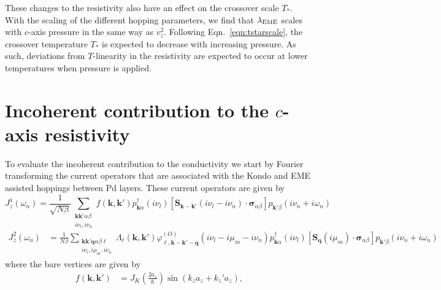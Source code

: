 \documentclass[aps,prl,twocolumn,superscriptaddress,amsmath,nofootinbib,10pt,floatfix]{revtex4-2}
\begin{document}
\begin{widetext}
 
These changes to the resistivity also have an effect on the crossover scale $T_*$. With the scaling of the different hopping parameters, we find that $\lambda_{\rm EME}$ scales with $c$-axis pressure in the same way as $v_z^2$. Following Eqn.~\ref{eqn:tstarscale},  the crossover temperature $T_*$ is expected to decrease with increasing pressure. As such, deviations from $T$-linearity in the resistivity are expected to occur at lower temperatures when pressure is applied.   


\section{Incoherent contribution to the $c$-axis resistivity} \label{appendix_caxis_inc}


To evaluate the incoherent contribution to the conductivity we start
by Fourier transforming the current operators that are associated
with the Kondo and EME assisted hoppings between Pd layers.
These current operators are given by 
\begin{equation}
J^{1}_{z}\left(\omega_{n}\right)=\frac{1}{\sqrt{N\beta}}\sum_{\begin{array}{c}
\boldsymbol{k}\boldsymbol{k}'\alpha\beta\\
i\nu_{l},i\nu_{n}
\end{array}}f\left(\boldsymbol{k},\boldsymbol{k}'\right)p_{\boldsymbol{k}\alpha}^{\dagger}\left(i\nu_{l}\right)\left[\bm{S}_{\boldsymbol{k}-\boldsymbol{k}'}\left(i\nu_{l}-i\nu_{n}\right)\cdot\bm{\sigma}_{\alpha\beta}\right]p_{\boldsymbol{k}'\beta}\left(i\nu_{n}+i\omega_{n}\right)
\end{equation}
\begin{align}
J^{2}_{z}\left(\omega_{n}\right) & =\frac{1}{N\beta}\sum_{\begin{array}{c}
\boldsymbol{k}\boldsymbol{k}'\boldsymbol{q}\alpha\beta \ell \\
i\nu_{l},i\mu_{m},i\nu_{n}
\end{array}}\Lambda_{\ell}\left(\boldsymbol{k},\boldsymbol{k}'\right)\varphi^{(O)}_{\ell,\boldsymbol{k}-\boldsymbol{k}'-\boldsymbol{q}}\left(i\nu_{l}-i\mu_{m}-i\nu_{n}\right)p_{\boldsymbol{k}\alpha}^{\dagger}\left(i\nu_{l}\right)\left[\bm{S}_{\boldsymbol{q}}\left(i\mu_{m}\right)\cdot\bm{\sigma}_{\alpha\beta}\right]p_{\boldsymbol{k}'\beta}\left(i\nu_{n}+i\omega_{n}\right)
\end{align}
where the bare vertices are given by 
\begin{align}
f\left(\boldsymbol{k},\boldsymbol{k}'\right) & =J_{K}\left(\frac{2a_{z}}{\hbar}\right) \sin\left(k_{z}a_{z}+k_{z}'a_{z}\right),

\end{align}
\end{widetext}
\end{document}

